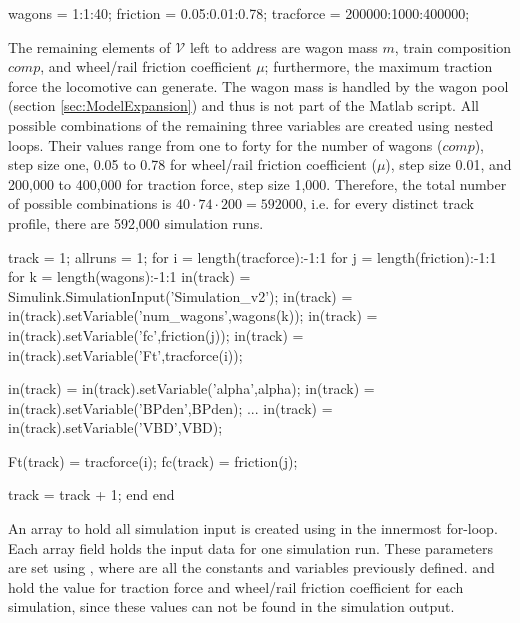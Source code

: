 \bigskip
\begin{python}
wagons = 1:1:40;
friction = 0.05:0.01:0.78;
tracforce = 200000:1000:400000;
\end{python}
\bigskip

\noindent
The remaining elements of ${\mathcal{V}}$ left to address are wagon mass $m$, train composition $comp$, and wheel/rail friction coefficient $\mu$; furthermore, the maximum traction force the locomotive can generate. The wagon mass is handled by the wagon pool (section \ref{sec:ModelExpansion}) and thus is not part of the Matlab script. All possible combinations of the remaining three variables are created using nested loops. Their values range from one to forty for the number of wagons ($comp$), step size one, 0.05 to 0.78 for wheel/rail friction coefficient ($\mu$), step size 0.01, and 200,000 to 400,000 for traction force, step size 1,000. Therefore, the total number of possible combinations is $40 \cdot 74 \cdot 200 = 592000$, i.e. for every distinct track profile, there are 592,000 simulation runs.   

\bigskip
\begin{python}
track = 1;
allruns = 1;
for i = length(tracforce):-1:1
	for j = length(friction):-1:1
		for k = length(wagons):-1:1
			in(track) = Simulink.SimulationInput('Simulation_v2');
			in(track) = in(track).setVariable('num_wagons',wagons(k));
			in(track) = in(track).setVariable('fc',friction(j));
			in(track) = in(track).setVariable('Ft',tracforce(i));
			
			in(track) = in(track).setVariable('alpha',alpha);
			in(track) = in(track).setVariable('BPden',BPden);
			...
			in(track) = in(track).setVariable('VBD',VBD);
			
			Ft(track) = tracforce(i);
			fc(track) = friction(j);
			
			track = track + 1;        
		end
	end
\end{python}
\bigskip

\noindent
An array to hold all simulation input is created using  in the innermost for-loop. Each array field holds the input data for one simulation run. These parameters are set using , where  are all the constants and variables previously defined.  and  hold the value for traction force and wheel/rail friction coefficient for each simulation, since these values can not be found in the simulation output.


